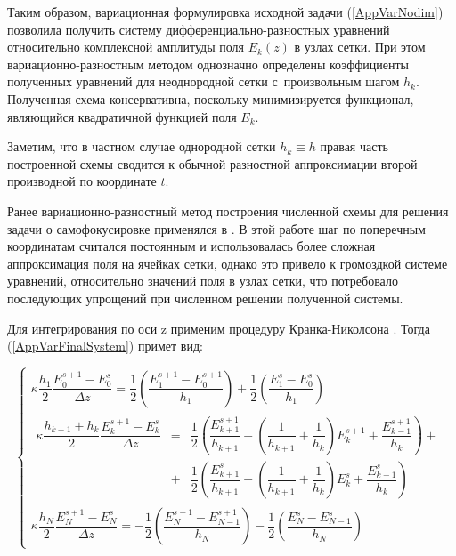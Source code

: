 Таким образом, вариационная формулировка исходной задачи (\ref{AppVarNodim}) позволила получить
систему дифференциально-разностных уравнений относительно комплексной амплитуды поля $E_k(z)$
в узлах сетки. При этом вариационно-разностным методом однозначно определены коэффициенты
полученных уравнений для неоднородной сетки с~произвольным шагом $h_k$. Полученная схема консервативна,
поскольку минимизируется функционал, являющийся квадратичной функцией поля $E_k$.

Заметим, что в частном случае однородной сетки $h_k \equiv h$ правая часть построенной схемы
сводится к обычной разностной аппроксимации второй производной по координате $t$.

Ранее вариационно-разностный метод построения численной схемы для решения задачи о самофокусировке
применялся в \cite{EgorovKandidovLedenev1982}. В этой работе шаг по поперечным координатам считался постоянным и
использовалась более сложная аппроксимация поля на ячейках сетки, однако это привело к громоздкой
системе уравнений, относительно значений поля в узлах сетки, что потребовало последующих упрощений
при численном решении полученной системы.

Для интегрирования по оси z применим процедуру Кранка-Николсона \cite{KalitkinChM}. Тогда (\ref{AppVarFinalSystem}) примет вид:

\begin{equation}\label{AppVarCrankNicolson}
\left\{
\begin{array}{l}
	\kappa \dfrac{h_1}{2} \dfrac{E_0^{s+1} - E_0^s}{\Delta z} =
	\dfrac{1}{2}\left(\dfrac{E_1^{s+1} - E_0^{s+1}}{h_1}\right) +
	\dfrac{1}{2}\left(\dfrac{E_1^s - E_0^s}{h_1}\right)\\[1em]

	\begin{array}{lll}
	\kappa \dfrac{h_{k+1} + h_k}{2} \dfrac{E_k^{s+1} - E_k^s}{\Delta z} & = &
	      \dfrac{1}{2}\left(\dfrac{E_{k+1}^{s+1}}{h_{k+1}} - \left(\dfrac{1}{h_{k+1}} +
	      \dfrac{1}{h_k}\right)E_k^{s+1} + \dfrac{E_{k-1}^{s+1}}{h_k}\right) + \\[1em]
	& + & \dfrac{1}{2}\left(\dfrac{E_{k+1}^s}{h_{k+1}} - \left(\dfrac{1}{h_{k+1}} +
	      \dfrac{1}{h_k}\right)E_k^s + \dfrac{E_{k-1}^s}{h_k}\right)
	\end{array}\\[2.5em]

	\kappa \dfrac{h_N}{2} \dfrac{E_N^{s+1} - E_N^s}{\Delta z} =
	- \dfrac{1}{2}\left(\dfrac{E_N^{s+1} - E_{N-1}^{s+1}}{h_N}\right) -
	\dfrac{1}{2}\left(\dfrac{E_N^s - E_{N-1}^s}{h_N}\right)
\end{array}
\right.
\end{equation}

